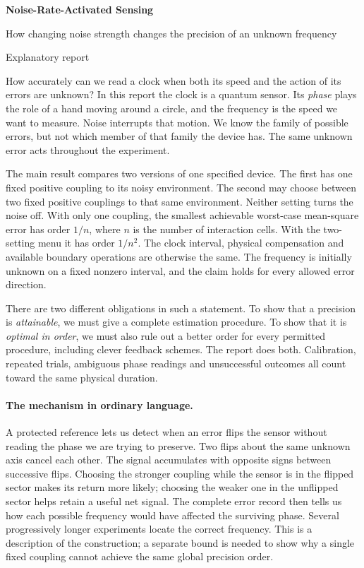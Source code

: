 \documentclass[11pt,a4paper]{article}
\numberwithin{equation}{section}
\theoremstyle{remark}
\begin{document}
\begin{center}
  {\color{ink}\LARGE\bfseries Noise-Rate-Activated Sensing\par}
  \vspace{0.45em}
  {\large How changing noise strength changes the precision of an unknown frequency\par}
  \vspace{0.65em}
  {\small Explanatory report}
\end{center}
\vspace{0.4em}

How accurately can we read a clock when both its speed and the action of its
errors are unknown? In this report the clock is a quantum sensor. Its
\emph{phase} plays the role of a hand moving around a circle, and the frequency
is the speed we want to measure. Noise interrupts that motion. We know the
family of possible errors, but not which member of that family the device
has. The same unknown error acts throughout the experiment.

The main result compares two versions of one specified device. The first
has one fixed positive coupling to its noisy environment. The second may
choose between two fixed positive couplings to that same environment.
Neither setting turns the noise off. With only one coupling, the smallest
achievable worst-case mean-square error has order $1/n$, where $n$ is the
number of interaction cells. With the two-setting menu it has order $1/n^2$.
The clock interval, physical compensation and available boundary operations
are otherwise the same. The frequency is initially unknown on a fixed
nonzero interval, and the claim holds for every allowed error direction.

There are two different obligations in such a statement. To show that a
precision is \emph{attainable}, we must give a complete estimation procedure.
To show that it is \emph{optimal in order}, we must also rule out a better
order for every permitted procedure, including clever feedback schemes.
The report does both. Calibration, repeated trials, ambiguous phase readings
and unsuccessful outcomes all count toward the same physical duration.

\paragraph{The mechanism in ordinary language.}
A protected reference lets us detect when an error flips the sensor without
reading the phase we are trying to preserve. Two flips about the same unknown
axis cancel each other. The signal accumulates with opposite signs between
successive flips. Choosing the stronger coupling while the sensor is in the
flipped sector makes its return more likely; choosing the weaker one in the
unflipped sector helps retain a useful net signal. The complete error record
then tells us how each possible frequency would have affected the surviving
phase. Several progressively longer experiments locate the correct frequency.
This is a description of the construction; a separate bound is needed to show
why a single fixed coupling cannot achieve the same global precision order.
\end{document}
